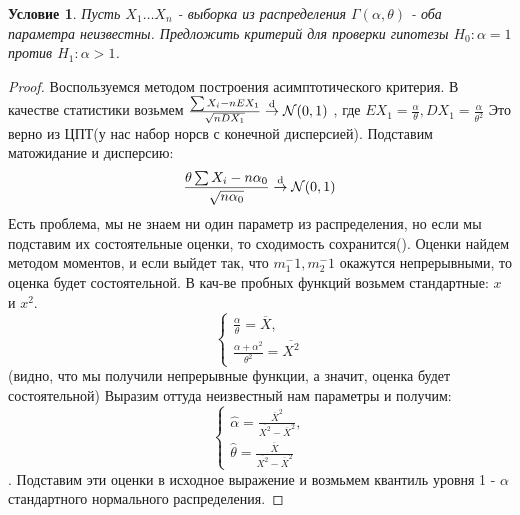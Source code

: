 \documentclass{article}
\newcommand{\totext}[1]{\stackrel{\textup{#1}}{\to}}
\theoremstyle{plain}
\newtheorem{condi}{Условие}
\theoremstyle{definition}
\begin{document}
\begin{condi}
	Пусть $X_1 \dots X_n $ - выборка из распределения $\Gamma(\alpha, \theta)$ - оба параметра неизвестны. Предложить критерий для проверки гипотезы $H_0: \alpha = 1$ против $H_1: \alpha > 1$.
\end{condi}

\begin{proof}
	Воспользуемся методом построения асимптотического критерия. В качестве статистики возьмем 
	$\frac{\sum X_i - nEX_1}{\sqrt{nDX_1}} \totext{d} \mathcal{N}(0, 1)$
	, где $EX_1 = \frac{\alpha}{\theta}, DX_1 = \frac{\alpha}{\theta^2}$ Это верно из ЦПТ(у нас набор норсв с конечной дисперсией). Подставим матожидание и дисперсию:
	$$\frac{\theta \sum X_i - n\alpha_0}{\sqrt{n\alpha_0}} \totext{d} \mathcal{N}(0, 1)$$ Есть проблема, мы не знаем ни один параметр из распределения, но если мы подставим их состоятельные оценки, то сходимость сохранится(). Оценки найдем методом моментов, и если выйдет так, что $m_1^-1 , m_2^-1$ окажутся непрерывными, то оценка будет состоятельной. В кач-ве пробных функций возьмем стандартные: $x$ и $x^2$. 
	$$ \begin{cases}
		\frac{\alpha}{\theta} = \overline{X}, \\
		\frac{\alpha + \alpha^2}{\theta^2} = \overline{X^2}
		\end{cases} $$ (видно, что мы получили непрерывные функции, а значит, оценка будет состоятельной) Выразим оттуда неизвестный нам параметры и получим:
		$$\begin{cases}
			\hat{\alpha} = \frac{\overline{X}^2}{\overline{X^2} - \overline{X}^2}, \\
			\hat{\theta} = \frac{\overline{X}}{\overline{X^2} - \overline{X}^2}
		\end{cases}$$. Подставим эти оценки в исходное выражение и возмьмем квантиль уровня 1 - $\alpha$ стандартного нормального распределения.
\end{proof}
\end{document}

